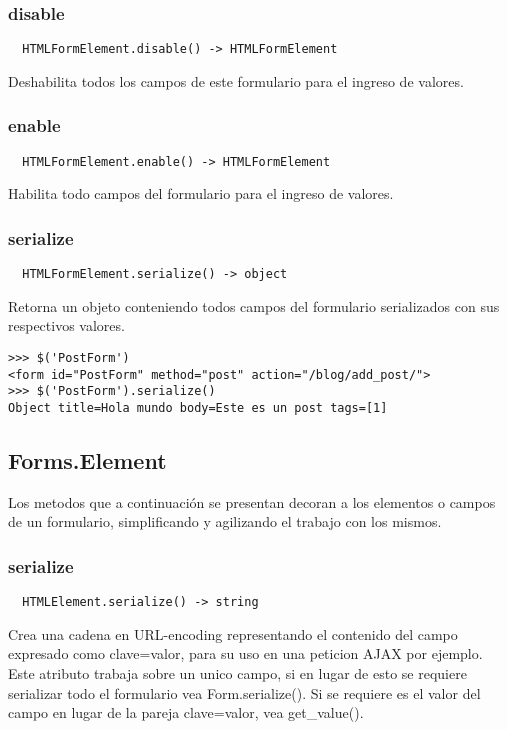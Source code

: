 \subsubsection*{disable}
\begin{verbatim}
  HTMLFormElement.disable() -> HTMLFormElement
\end{verbatim}
Deshabilita todos los campos de este formulario para el ingreso de
valores.

\subsubsection*{enable}
\begin{verbatim}
  HTMLFormElement.enable() -> HTMLFormElement
\end{verbatim}
Habilita todo campos del formulario para el ingreso de valores.

\subsubsection*{serialize}
\begin{verbatim}
  HTMLFormElement.serialize() -> object
\end{verbatim}
Retorna un objeto conteniendo todos campos del formulario serializados
con sus respectivos valores.

\begin{lstlisting}[style=consola]
>>> $('PostForm')
<form id="PostForm" method="post" action="/blog/add_post/">
>>> $('PostForm').serialize()
Object title=Hola mundo body=Este es un post tags=[1]
\end{lstlisting}

\subsection{Forms.Element}
Los metodos que a continuación se presentan decoran a los elementos o campos de
un formulario, simplificando y agilizando el trabajo con los mismos.
\subsubsection*{serialize}
\begin{verbatim}
  HTMLElement.serialize() -> string
\end{verbatim}
Crea una cadena en URL-encoding representando el contenido del
campo expresado como clave=valor, para su uso en una peticion AJAX por
ejemplo.
Este atributo trabaja sobre un unico campo, si en lugar de esto se requiere
serializar todo el formulario vea Form.serialize().
Si se requiere es el valor del campo en lugar de la pareja clave=valor, vea
get\_value().

